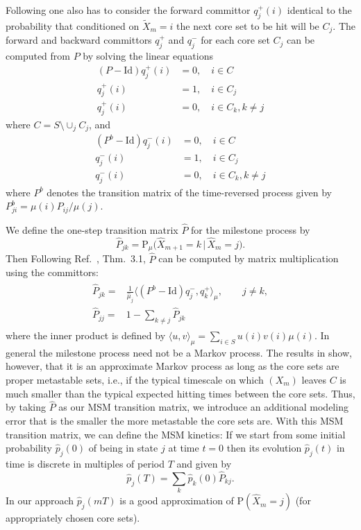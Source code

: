 \documentclass[aps, pre, preprint,unsortedaddress,a4paper,onecolumn,showkeys]{revtex4}
\newcommand{\vect}[1]{#1}
\newcommand{\fwd}[0]{+}
\newcommand{\bwd}[0]{-}
\newcommand{\id}{\mathrm{Id}}
\newcommand{\prob}{\textrm{P}}
\begin{document}
Following \cite{discreteTPT} one also has to consider the forward committor $q^\fwd_j(i)$ identical to the probability  that conditioned on $\tilde X_m=i$ the next core set to be hit will be $C_j$.
The forward and backward committors $q^\fwd_j$ and $q^\bwd_j$  for each core set $C_j$ can be computed from $P$ by solving the linear equations \cite{discreteTPT}
\begin{align}
(P-\id) q^\fwd_j(i) & =  0, \quad i\in C\label{qfwd}\\
q^\fwd_j(i) & =  1,\quad i\in C_j\nonumber\\
q^\fwd_j(i) & =  0,\quad i\in C_k,k\not=j\nonumber
\end{align}
where $C=S\setminus\cup_j C_j$, and
\begin{align}
(P^b-\id) q^\bwd_j(i) & =  0, \quad i\in C\label{qbwd}\\
q^\bwd_j(i) & =  1,\quad i\in C_j\nonumber \\
q^\bwd_j(i) & =  0,\quad i\in C_k,k\not=j\nonumber
\end{align}
where $P^b$ denotes the transition matrix of the time-reversed process
given by $P^b_{ji}=\mu(i) P_{ij}/\mu(j)$.

We define the one-step transition matrix $\hat{\vect P}$ for the milestone process by
\begin{equation}\label{hatP_prob}
\hat{\vect P}_{jk}=\prob_\mu\Big(\hat{X}_{m+1}=k\,\vert\, \hat{X}_m=j\Big).
\end{equation}
Then Following
Ref.~\cite{djurdjevac2010markov}, Thm.~3.1, 
$\hat{\vect P}$ can be computed by matrix multiplication using the committors:
  \begin{align}
    \label{eq:msm-tmatrix-00}
    \begin{split}      
    \hat{\vect P}_{jk}
    = &
    \frac{1}{\hat{\mu}_j}
    \langle (\vect P^b - \id) q^\bwd_j,q^\fwd_k \rangle_\mu,\qquad j\not= k, \\    %
    \hat{\vect P}_{jj}
    =&
    1-\sum_{k\not=j} \hat{\vect P}_{jk}
    \end{split}
  \end{align}
where the inner product is defined by
$\langle u,v \rangle_\mu=\sum_{i\in S} u(i) v(i) \mu(i)$. 
In general the milestone process need not be a Markov process. The results in \cite{A19-31,sarich2014utilizing} show, however, that it is an approximate Markov process as long as the core sets are proper metastable sets, i.e., if the typical timescale on which $(X_m)$ leaves $C$ is much smaller than the typical expected hitting times between the core sets.
Thus, by taking $\hat{P}$ as our MSM transition matrix, we introduce an additional modeling error that is the smaller the more metastable the core sets are.
With this MSM transition matrix, we can define the MSM kinetics:
If we start from some initial probability $\hat{p}_j(0)$ of being in state $j$ at time $t=0$ then its evolution $\hat{p}_j(t)$ in time is discrete in multiples of period $T$ and given by
\begin{equation}\label{eq:num-29}
\hat{p}_j(T)=\sum_k \hat{p}_k(0)\hat{\vect P}_{kj}.
\end{equation}
In our approach $\hat p_j(mT)$ is a good approximation of $\prob(\hat{X}_m=j)$ (for appropriately chosen core sets).
\end{document}
